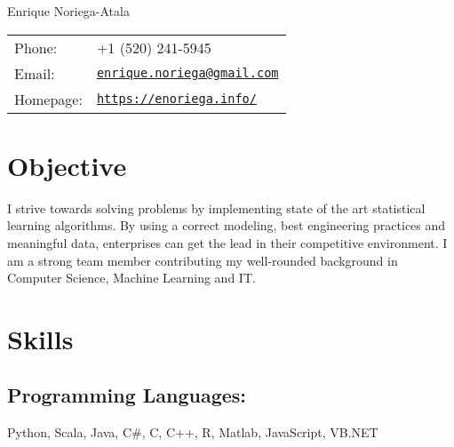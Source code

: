 \documentclass[letterpaper]{article}
\def\name{Enrique Noriega-Atala}
\renewenvironment{itemize}{
  \begin{list}{}{
    \setlength{\leftmargin}{1.5em}
  }
}{
  \end{list}
}
\begin{document}
{\huge \name}


\vspace{0.25in}

\begin{minipage}{0.45\linewidth}
  \begin{tabular}{ll}
    Phone: & +1 (520) 241-5945 \\
    Email: & \href{mailto:enrique.noriega@gmail.com}{\tt enrique.noriega@gmail.com} \\
    Homepage: & \href{https://enoriega.info/}{\tt https://enoriega.info/} \\
  \end{tabular}
\end{minipage}


%

\section*{Objective}
I strive towards solving problems by implementing state of the art statistical learning algorithms. By using a correct modeling, best engineering practices and meaningful data, enterprises can get the lead in their competitive environment. I am a strong team member contributing my well-rounded background in Computer Science, Machine Learning and IT.


\section*{Skills}
\subsection*{Programming Languages:}
\begin{itemize}
	\item Python, Scala, Java, C\#, C, C++, R, Matlab, JavaScript, VB.NET
\end{itemize}
\vspace{-2em}
\end{document}
